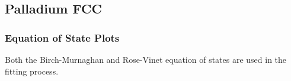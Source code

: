 
\clearpage
\FloatBarrier
\subsection{Palladium FCC}





\subsubsection{Equation of State Plots}

Both the Birch-Murnaghan and Rose-Vinet equation of states are used in the fitting process.

